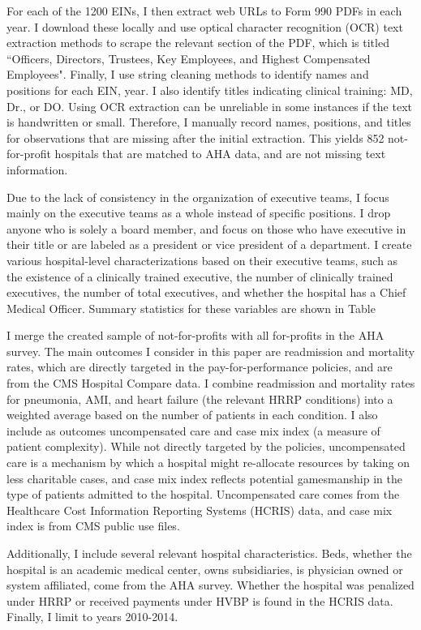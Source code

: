 \documentclass[12pt]{article}
\begin{document}
    For each of the 1200 EINs, I then extract web URLs to Form 990 PDFs in each year. I download these locally and use optical character recognition (OCR) text extraction methods to scrape the relevant section of the PDF, which is titled ``Officers, Directors, Trustees, Key Employees, and Highest Compensated Employees". Finally, I use string cleaning methods to identify names and positions for each EIN, year. I also identify titles indicating clinical training: MD, Dr., or DO. Using OCR extraction can be unreliable in some instances if the text is handwritten or small. Therefore, I manually record names, positions, and titles for observations that are missing after the initial extraction. This yields 852 not-for-profit hospitals that are matched to AHA data, and are not missing text information. 

    Due to the lack of consistency in the organization of executive teams, I focus mainly on the executive teams as a whole instead of specific positions. I drop anyone who is solely a board member, and focus on those who have executive in their title or are labeled as a president or vice president of a department. I create various hospital-level characterizations based on their executive teams, such as the existence of a clinically trained executive, the number of clinically trained executives, the number of total executives, and whether the hospital has a Chief Medical Officer. Summary statistics for these variables are shown in Table 

    I merge the created sample of not-for-profits with all for-profits in the AHA survey. The main outcomes I consider in this paper are readmission and mortality rates, which are directly targeted in the pay-for-performance policies, and are from the CMS Hospital Compare data. I combine readmission and mortality rates for pneumonia, AMI, and heart failure (the relevant HRRP conditions) into a weighted average based on the number of patients in each condition. I also include as outcomes uncompensated care and case mix index (a measure of patient complexity). While not directly targeted by the policies, uncompensated care is a mechanism by which a hospital might re-allocate resources by taking on less charitable cases, and case mix index reflects potential gamesmanship in the type of patients admitted to the hospital. Uncompensated care comes from the Healthcare Cost Information Reporting Systems (HCRIS) data, and case mix index is from CMS public use files. 

    Additionally, I include several relevant hospital characteristics. Beds, whether the hospital is an academic medical center, owns subsidiaries, is physician owned or system affiliated, come from the AHA survey. Whether the hospital was penalized under HRRP or received payments under HVBP is found in the HCRIS data. Finally, I limit to years 2010-2014.
\end{document}

